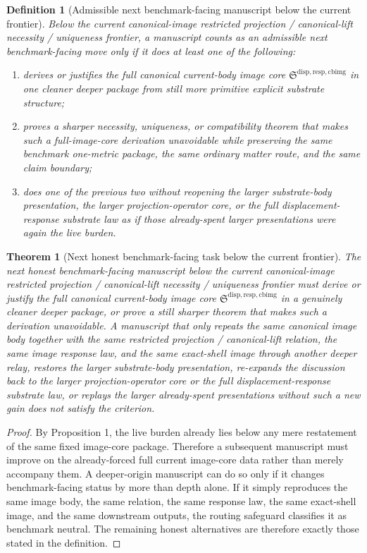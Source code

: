 \documentclass[11pt]{article}
\newcommand{\CurrentBodyImageCore}{\mathfrak S^{\mathrm{disp,resp,cbimg}}}
\newtheorem{definition}{Definition}
\newtheorem{theorem}{Theorem}
\begin{document}
\begin{definition}[Admissible next benchmark-facing manuscript below the current frontier]
Below the current canonical-image restricted projection / canonical-lift necessity / uniqueness frontier, a manuscript counts as an admissible next benchmark-facing move only if it does at least one of the following:
\begin{enumerate}
    \item derives or justifies the full canonical current-body image core \(\CurrentBodyImageCore\) in one cleaner deeper package from still more primitive explicit substrate structure;
    \item proves a sharper necessity, uniqueness, or compatibility theorem that makes such a full-image-core derivation unavoidable while preserving the same benchmark one-metric package, the same ordinary matter route, and the same claim boundary;
    \item does one of the previous two without reopening the larger substrate-body presentation, the larger projection-operator core, or the full displacement-response substrate law as if those already-spent larger presentations were again the live burden.
\end{enumerate}
\end{definition}

\begin{theorem}[Next honest benchmark-facing task below the current frontier]
The next honest benchmark-facing manuscript below the current canonical-image restricted projection / canonical-lift necessity / uniqueness frontier must derive or justify the full canonical current-body image core \(\CurrentBodyImageCore\) in a genuinely cleaner deeper package, or prove a still sharper theorem that makes such a derivation unavoidable. A manuscript that only repeats the same canonical image body together with the same restricted projection / canonical-lift relation, the same image response law, and the same exact-shell image through another deeper relay, restores the larger substrate-body presentation, re-expands the discussion back to the larger projection-operator core or the full displacement-response substrate law, or replays the larger already-spent presentations without such a new gain does not satisfy the criterion.
\end{theorem}

\begin{proof}
By Proposition 1, the live burden already lies below any mere restatement of the same fixed image-core package. Therefore a subsequent manuscript must improve on the already-forced full current image-core data rather than merely accompany them. A deeper-origin manuscript can do so only if it changes benchmark-facing status by more than depth alone. If it simply reproduces the same image body, the same relation, the same response law, the same exact-shell image, and the same downstream outputs, the routing safeguard classifies it as benchmark neutral. The remaining honest alternatives are therefore exactly those stated in the definition.
\end{proof}
\end{document}
